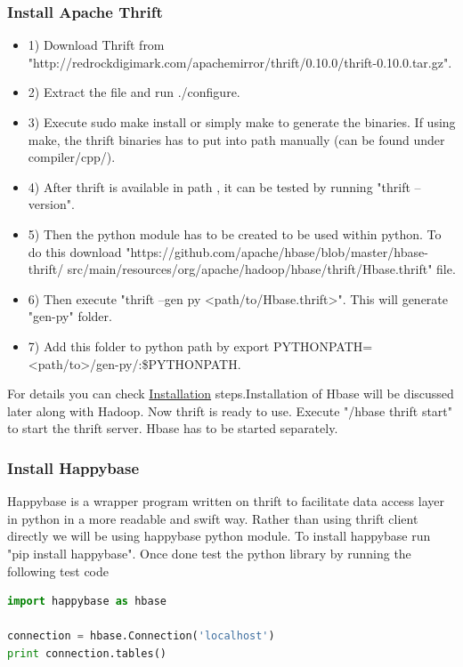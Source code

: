 \documentclass[9pt,twocolumn,twoside]{../../styles/osajnl}
\begin{document}
\subsubsection{Install Apache Thrift \cite{thrift-python-install}}
\begin{itemize}
\item 1) Download Thrift from 
"http://redrockdigimark.com/apachemirror/thrift/0.10.0/thrift-0.10.0.tar.gz".
\item 2) Extract the file and run ./configure.
\item 3) Execute sudo make install or simply make to generate the binaries.
 If using make, the thrift binaries has to put into path manually 
 (can be found under compiler/cpp/).
\item 4) After thrift is available in path , it can be tested by 
running "thrift --version".
\item 5) Then the python module has to be created to be used within python.
 To do this download "https://github.com/apache/hbase/blob/master/hbase-thrift/
 src/main/resources/org/apache/hadoop/hbase/thrift/Hbase.thrift" file.
\item 6) Then execute "thrift --gen py <path/to/Hbase.thrift>". This will 
generate "gen-py" folder.
\item 7) Add this folder to python path by export 
PYTHONPATH=<path/to>/gen-py/:\$PYTHONPATH.
\end{itemize}
For details you can check \href{https://acadgild.com/blog/connecting-hbase-with-python-application-using-thrift-server/}{Installation} steps.Installation of Hbase will be discussed later along with Hadoop.
Now thrift is ready to use. Execute "/hbase thrift start" to start the thrift server. Hbase has to be started separately.
\subsubsection{Install Happybase \cite{happybase-install}}
Happybase is a wrapper program written on thrift to facilitate data access layer in python in a more readable and swift way. Rather than using thrift client directly we will be using happybase python module. To install happybase run "pip install happybase". 
Once done test the python library by running the following test code 
\begin{lstlisting}[language=Python,caption=Connect-Hbase,breaklines=true]
import happybase as hbase				

connection = hbase.Connection('localhost')
print connection.tables()
\end{lstlisting}
\end{document}
